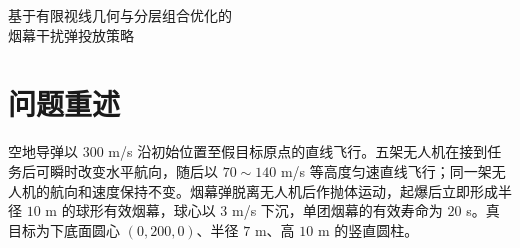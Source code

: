 \documentclass[UTF8,a4paper,12pt,fontset=windows]{ctexart}
\begin{document}
\begin{center}
  {\heiti{} 基于有限视线几何与分层组合优化的\\[0.2em]
  烟幕干扰弹投放策略}
\end{center}

\begin{abstract}
针对多无人机协同投放烟幕干扰弹以延长真目标有效遮蔽时间的问题，本文建立三维解析运动学、有限视线遮蔽判定和连续时间区间并集模型。考虑到题目对遮蔽对象的几何定义存在解释空间，本文以导弹至真目标几何中心的有限视线被烟幕球截断作为中心视线判据，并以圆柱整体被遮蔽作为保守判据。有效区间端点先由离散扫描确定根区间，再利用 Brent 法连续求根。

对于问题一，根据给定投放策略计算无人机、烟幕弹和烟幕云团的运动轨迹。中心视线判据下的有效区间为 $[8.0130,9.4481]$ s，有效遮蔽时长为 $1.4351$ s；圆柱整体遮蔽判据下的时长为 $1.3916$ s。对于问题二，以航向、速度、投放时刻和引信延时为决策变量，采用差分进化搜索候选解，并用 Powell 法和连续求根进行局部精化，得到有效遮蔽时长 $4.8325$ s。8 组随机种子均得到可行解，最终目标值极差为 $3.3\times10^{-13}$ s。

对于问题三，以区间新增覆盖长度为组合准则，在同一航路上协调三枚烟幕弹，得到连续遮蔽区间 $[4.8077,11.4388]$ s，总时长为 $6.6311$ s。对于问题四，根据有效区间的时间位置构造三机候选集，所得三个遮蔽窗口互不重叠，总时长为 $15.7746$ s。对于问题五，构造满足同机航向、速度和投放间隔约束的候选组合，并通过有限状态搜索完成烟幕弹与三枚导弹的联合指派。在给定随机种子和候选航路集下，得到总有效遮蔽时长 $53.0839$ s 的可行方案；按圆柱整体遮蔽判据复核后，总时长为 $41.3551$ s。问题三的五组随机种子结果极差为 $0.9510$ s，问题五尚未进行多随机种子重复试验，因此两问结果均表述为经连续计算确认的可行解，不作全局最优性判断。

所有输出方案均通过约束检验、连续边界复核和结果表反算。连续求根提高了已确定根区间内的端点精度，但固定步长扫描仍可能漏掉极窄正区间或切触；因此问题三至问题五均按现有验证强度报告为可行方案。

\par\noindent\textbf{关键词：}烟幕干扰；有限视线；连续求根；区间并集；组合优化
\end{abstract}

\section{问题重述}

空地导弹以 $300$ m/s 沿初始位置至假目标原点的直线飞行。五架无人机在接到任务后可瞬时改变水平航向，随后以 $70\sim140$ m/s 等高度匀速直线飞行；同一架无人机的航向和速度保持不变。烟幕弹脱离无人机后作抛体运动，起爆后立即形成半径 $10$ m 的球形有效烟幕，球心以 $3$ m/s 下沉，单团烟幕的有效寿命为 $20$ s。真目标为下底面圆心 $(0,200,0)$、半径 $7$ m、高 $10$ m 的竖直圆柱\cite{problem}。
\end{document}
